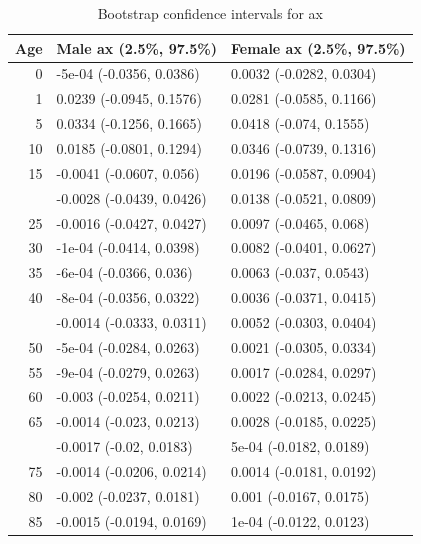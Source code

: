 \documentclass[
  12pt,
]{report}
\begin{document}
\begin{longtable}[t]{rll}
\caption{\label{tab:unnamed-chunk-14}Bootstrap confidence intervals for ax}\\
\toprule
Age & Male ax (2.5\%, 97.5\%) & Female ax (2.5\%, 97.5\%)\\
\midrule
0 & -5e-04 (-0.0356, 0.0386) & 0.0032 (-0.0282, 0.0304)\\
1 & 0.0239 (-0.0945, 0.1576) & 0.0281 (-0.0585, 0.1166)\\
5 & 0.0334 (-0.1256, 0.1665) & 0.0418 (-0.074, 0.1555)\\
10 & 0.0185 (-0.0801, 0.1294) & 0.0346 (-0.0739, 0.1316)\\
15 & -0.0041 (-0.0607, 0.056) & 0.0196 (-0.0587, 0.0904)\\
\addlinespace
20 & -0.0028 (-0.0439, 0.0426) & 0.0138 (-0.0521, 0.0809)\\
25 & -0.0016 (-0.0427, 0.0427) & 0.0097 (-0.0465, 0.068)\\
30 & -1e-04 (-0.0414, 0.0398) & 0.0082 (-0.0401, 0.0627)\\
35 & -6e-04 (-0.0366, 0.036) & 0.0063 (-0.037, 0.0543)\\
40 & -8e-04 (-0.0356, 0.0322) & 0.0036 (-0.0371, 0.0415)\\
\addlinespace
45 & -0.0014 (-0.0333, 0.0311) & 0.0052 (-0.0303, 0.0404)\\
50 & -5e-04 (-0.0284, 0.0263) & 0.0021 (-0.0305, 0.0334)\\
55 & -9e-04 (-0.0279, 0.0263) & 0.0017 (-0.0284, 0.0297)\\
60 & -0.003 (-0.0254, 0.0211) & 0.0022 (-0.0213, 0.0245)\\
65 & -0.0014 (-0.023, 0.0213) & 0.0028 (-0.0185, 0.0225)\\
\addlinespace
70 & -0.0017 (-0.02, 0.0183) & 5e-04 (-0.0182, 0.0189)\\
75 & -0.0014 (-0.0206, 0.0214) & 0.0014 (-0.0181, 0.0192)\\
80 & -0.002 (-0.0237, 0.0181) & 0.001 (-0.0167, 0.0175)\\
85 & -0.0015 (-0.0194, 0.0169) & 1e-04 (-0.0122, 0.0123)\\
\bottomrule
\end{longtable}
\endgroup{}
\end{document}
